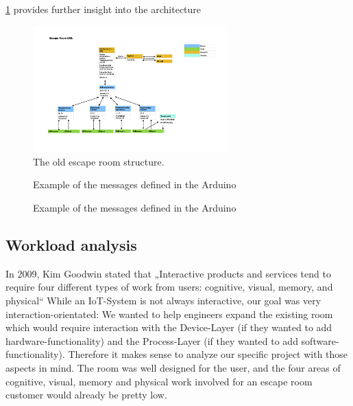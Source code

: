 \ref{fig:oldEscapeUml} provides further insight into the architecture
\begin{figure}[th]
	\centering
	\includegraphics[width=75mm,scale=0.75]{Figures/oldEscapeUml}
	\decoRule
	\caption[UML]{The old escape room structure.}
	\label{fig:oldEscapeUml}
\end{figure}
\begin{figure}[th]
    \decoRule
    \caption[messages]{Example of the messages defined in the Arduino}
    \label{fig:switchCase}
\end{figure}
\begin{figure}[th]
    \decoRule
    \caption[messages]{Example of the messages defined in the Arduino}
    \label{fig:c++window}
\end{figure}

\subsection{Workload analysis}
In 2009, Kim Goodwin stated that 
„Interactive products and services tend to require four different types of work from users: 
cognitive, visual, memory, and physical“ \parencite{designDigitalAge} 
While an IoT-System is not always interactive, our goal was very interaction-orientated: We wanted to help engineers expand the existing room which would require 
interaction with the Device-Layer (if they wanted to add hardware-functionality) 
and the Process-Layer (if they wanted to add software-functionality).
Therefore it makes sense to analyze our specific project with those aspects in mind. 
The room was well designed for the user, and the four areas of cognitive, visual, memory and physical work involved for an escape room customer would already be pretty low.

